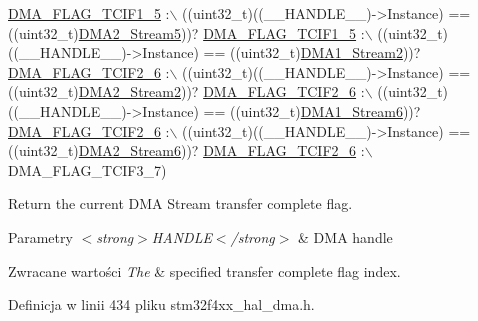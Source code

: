 \begin{DoxyCode}
      \hyperlink{group___d_m_a__flag__definitions_ga9546185449ae979fad0aa5e33310c0ab}{DMA\_FLAG\_TCIF1\_5} :\(\backslash\)
 ((uint32\_t)((\_\_HANDLE\_\_)->Instance) == ((uint32\_t)\hyperlink{group___peripheral__declaration_gac40f58718761251875b5a897287efd83}{DMA2\_Stream5}))? 
      \hyperlink{group___d_m_a__flag__definitions_ga9546185449ae979fad0aa5e33310c0ab}{DMA\_FLAG\_TCIF1\_5} :\(\backslash\)
 ((uint32\_t)((\_\_HANDLE\_\_)->Instance) == ((uint32\_t)\hyperlink{group___peripheral__declaration_gad0e2140b8eeec3594035f1a7bf2a7250}{DMA1\_Stream2}))? 
      \hyperlink{group___d_m_a__flag__definitions_gab8096a50b81e30e474e2b1148b55a983}{DMA\_FLAG\_TCIF2\_6} :\(\backslash\)
 ((uint32\_t)((\_\_HANDLE\_\_)->Instance) == ((uint32\_t)\hyperlink{group___peripheral__declaration_ga71bb410664b861ff0520f08976e24ee1}{DMA2\_Stream2}))? 
      \hyperlink{group___d_m_a__flag__definitions_gab8096a50b81e30e474e2b1148b55a983}{DMA\_FLAG\_TCIF2\_6} :\(\backslash\)
 ((uint32\_t)((\_\_HANDLE\_\_)->Instance) == ((uint32\_t)\hyperlink{group___peripheral__declaration_gac95127480470900755953f1cfe68567d}{DMA1\_Stream6}))? 
      \hyperlink{group___d_m_a__flag__definitions_gab8096a50b81e30e474e2b1148b55a983}{DMA\_FLAG\_TCIF2\_6} :\(\backslash\)
 ((uint32\_t)((\_\_HANDLE\_\_)->Instance) == ((uint32\_t)\hyperlink{group___peripheral__declaration_ga11a00b283e0911cd427e277e5a314ccc}{DMA2\_Stream6}))? 
      \hyperlink{group___d_m_a__flag__definitions_gab8096a50b81e30e474e2b1148b55a983}{DMA\_FLAG\_TCIF2\_6} :\(\backslash\)
   DMA\_FLAG\_TCIF3\_7)
\end{DoxyCode}


Return the current D\+MA Stream transfer complete flag. 


\begin{DoxyParams}{Parametry}
{\em $<$strong$>$\+H\+A\+N\+D\+L\+E$<$/strong$>$} & D\+MA handle \\
\hline
\end{DoxyParams}

\begin{DoxyRetVals}{Zwracane wartości}
{\em The} & specified transfer complete flag index. \\
\hline
\end{DoxyRetVals}


Definicja w linii 434 pliku stm32f4xx\+\_\+hal\+\_\+dma.\+h.

\mbox{\label{group___d_m_a_ga5e765bb3b1c5fc9f1b1abbbb764250bc}} 
